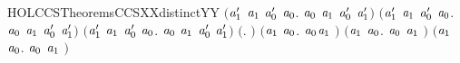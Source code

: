 \begin{SaveVerbatim}{HOLCCSTheoremsCCSXXdistinctYY}
   \ensuremath{(}\HOLSymConst{\HOLTokenForall{}}\ensuremath{\HOLBoundVar{a}\sb{\mathrm{1}}\sp{\prime}} \ensuremath{\HOLBoundVar{a}\sb{\mathrm{1}}} \ensuremath{\HOLBoundVar{a}\sb{\mathrm{0}}\sp{\prime}} \ensuremath{\HOLBoundVar{a}\sb{\mathrm{0}}}.  \ensuremath{\HOLBoundVar{a}\sb{\mathrm{0}}} \ensuremath{\HOLBoundVar{a}\sb{\mathrm{1}}} \HOLSymConst{\HOLTokenNotEqual{}}  \ensuremath{\HOLBoundVar{a}\sb{\mathrm{0}}\sp{\prime}} \ensuremath{\HOLBoundVar{a}\sb{\mathrm{1}}\sp{\prime}}\ensuremath{)} \HOLSymConst{\HOLTokenConj{}}
   \ensuremath{(}\HOLSymConst{\HOLTokenForall{}}\ensuremath{\HOLBoundVar{a}\sb{\mathrm{1}}\sp{\prime}} \ensuremath{\HOLBoundVar{a}\sb{\mathrm{1}}} \ensuremath{\HOLBoundVar{a}\sb{\mathrm{0}}\sp{\prime}} \ensuremath{\HOLBoundVar{a}\sb{\mathrm{0}}}.  \ensuremath{\HOLBoundVar{a}\sb{\mathrm{0}}} \ensuremath{\HOLBoundVar{a}\sb{\mathrm{1}}} \HOLSymConst{\HOLTokenNotEqual{}}  \ensuremath{\HOLBoundVar{a}\sb{\mathrm{0}}\sp{\prime}} \ensuremath{\HOLBoundVar{a}\sb{\mathrm{1}}\sp{\prime}}\ensuremath{)} \HOLSymConst{\HOLTokenConj{}}
   \ensuremath{(}\HOLSymConst{\HOLTokenForall{}}\ensuremath{\HOLBoundVar{a}\sb{\mathrm{1}}\sp{\prime}} \ensuremath{\HOLBoundVar{a}\sb{\mathrm{1}}} \ensuremath{\HOLBoundVar{a}\sb{\mathrm{0}}\sp{\prime}} \ensuremath{\HOLBoundVar{a}\sb{\mathrm{0}}}.  \ensuremath{\HOLBoundVar{a}\sb{\mathrm{0}}} \ensuremath{\HOLBoundVar{a}\sb{\mathrm{1}}} \HOLSymConst{\HOLTokenNotEqual{}}  \ensuremath{\HOLBoundVar{a}\sb{\mathrm{0}}\sp{\prime}} \ensuremath{\HOLBoundVar{a}\sb{\mathrm{1}}\sp{\prime}}\ensuremath{)} \HOLSymConst{\HOLTokenConj{}}
   \ensuremath{(}\HOLSymConst{\HOLTokenForall{}}.   \HOLSymConst{\HOLTokenNotEqual{}} \ensuremath{)} \HOLSymConst{\HOLTokenConj{}} \ensuremath{(}\HOLSymConst{\HOLTokenForall{}}\ensuremath{\HOLBoundVar{a}\sb{\mathrm{1}}} \ensuremath{\HOLBoundVar{a}\sb{\mathrm{0}}}. \ensuremath{\HOLBoundVar{a}\sb{\mathrm{0}}}\HOLSymConst{\ensuremath{\ldotp}}\ensuremath{\HOLBoundVar{a}\sb{\mathrm{1}}} \HOLSymConst{\HOLTokenNotEqual{}} \ensuremath{)} \HOLSymConst{\HOLTokenConj{}}
   \ensuremath{(}\HOLSymConst{\HOLTokenForall{}}\ensuremath{\HOLBoundVar{a}\sb{\mathrm{1}}} \ensuremath{\HOLBoundVar{a}\sb{\mathrm{0}}}. \ensuremath{\HOLBoundVar{a}\sb{\mathrm{0}}} \HOLSymConst{\ensuremath{+}} \ensuremath{\HOLBoundVar{a}\sb{\mathrm{1}}} \HOLSymConst{\HOLTokenNotEqual{}} \ensuremath{)} \HOLSymConst{\HOLTokenConj{}} \ensuremath{(}\HOLSymConst{\HOLTokenForall{}}\ensuremath{\HOLBoundVar{a}\sb{\mathrm{1}}} \ensuremath{\HOLBoundVar{a}\sb{\mathrm{0}}}. \ensuremath{\HOLBoundVar{a}\sb{\mathrm{0}}} \HOLSymConst{\ensuremath{\mid}} \ensuremath{\HOLBoundVar{a}\sb{\mathrm{1}}} \HOLSymConst{\HOLTokenNotEqual{}} \ensuremath{)} \HOLSymConst{\HOLTokenConj{}}

\end{SaveVerbatim}
